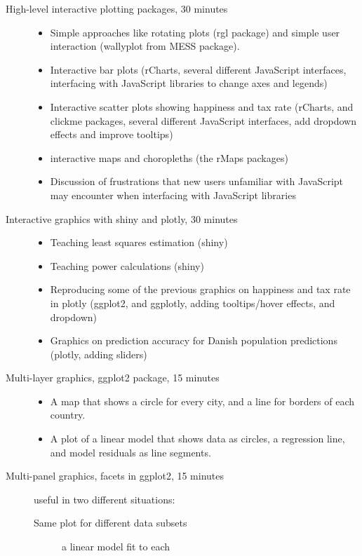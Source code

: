 \documentclass[11pt]{article}
\begin{document}
\begin{description}
\item[{High-level interactive plotting packages, 30 minutes}] \begin{itemize}
\item Simple approaches like rotating plots (rgl package) and simple user
interaction (wallyplot from MESS package).
\item Interactive bar plots (rCharts, several different JavaScript
interfaces, interfacing with JavaScript libraries to change axes
and legends)
\item Interactive scatter plots showing happiness and tax rate (rCharts,
and clickme packages, several different JavaScript interfaces, add
dropdown effects and improve tooltips)
\item interactive maps and choropleths (the rMaps packages)
\item Discussion of frustrations that new users unfamiliar with
JavaScript may encounter when interfacing with JavaScript libraries
\end{itemize}
\item[{Interactive graphics with shiny and plotly, 30 minutes}] \begin{itemize}
\item Teaching least squares estimation (shiny)
\item Teaching power calculations (shiny)
\item Reproducing some of the previous graphics on happiness and tax
rate in plotly (ggplot2, and ggplotly, adding tooltips/hover
effects, and dropdown)
\item Graphics on prediction accuracy for Danish population predictions
(plotly, adding sliders)
\end{itemize}
\item[{Multi-layer graphics, ggplot2 package, 15 minutes}] \begin{itemize}
\item A map that shows a circle for every city, and a line for borders of
each country.
\item A plot of a linear model that shows data as circles, a regression
line, and model residuals as line segments.
\end{itemize}
\item[{Multi-panel graphics, facets in ggplot2, 15 minutes}] useful in two
different situations:
\begin{description}
\item[{Same plot for different data subsets}] a linear model fit to each

\end{description}
\end{description}
\end{document}
